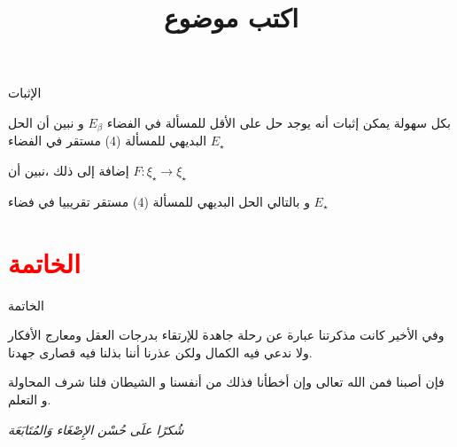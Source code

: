 \documentclass[dvipsnames,mathserif]{beamer}
\begin{document}
\begin{frame}{الإثبات }
\begin{tcolorbox}[enhanced,arc=3mm,boxrule=1.5mm,boxsep=1.5mm,
colback=yellow!20!white,
colframe=blue,
borderline={1mm}{1mm}{yellow},
borderline={1mm}{2mm}{green} ]
بكل سهولة يمكن إثبات أنه يوجد حل على الأقل للمسألة
في الفضاء
$E_\beta$ 
و نبين أن الحل البديهي للمسألة (4) مستقر في الفضاء  $E_\star$ 

إضافة إلى ذلك ،نبين أن 
$F:{\xi _\star } \to {\xi _\star }$

و بالتالي الحل البديهي للمسألة (4) مستقر تقريبيا في فضاء 
$E_{\star}$ 
\end{tcolorbox}
\end{frame}
\title{اكتب موضوع}
\section{\textcolor{red}{الخاتمة}} 
 \begin{frame}{الخاتمة}
\begin{bekhadda}[title=\textcolor{red}{الخاتمة}]
  وفي الأخير كانت مذكرتنا عبارة عن رحلة جاهدة للإرتقاء بدرجات العقل
ومعارج الأفكار ولا ندعي فيه الكمال ولكن عذرنا أننا بذلنا فيه قصارى
جهدنا.

فإن أصبنا فمن الله تعالى وإن أخطأنا فذلك من أنفسنا و الشيطان فلنا شرف المحاولة و التعلم. 
\end{bekhadda}
\end{frame}

\begin{frame}[plain]
\begin{center}
\quad
{}
\quad
{}
\end{center}
\begin{tcolorbox}[colback=white,drop large lifted shadow,top=.2cm,bottom=.5cm]
{\begin{center}
	{\Huge\emph{{{شُكرًا علَى حُسْن الإِصْغَاء وَالمُتَابَعَة}}}}
	\end{center}}
\end{tcolorbox}
\end{frame}
\end{document}
